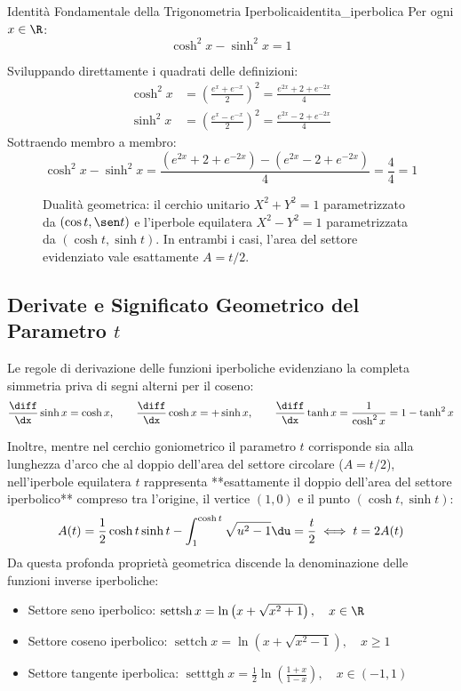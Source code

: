 \begin{teorema}{Identità Fondamentale della Trigonometria Iperbolica}{identita_iperbolica}
Per ogni $x \in \R$:
\[
    \cosh^2 x - \sinh^2 x = 1
\]
\end{teorema}

\begin{dimostrazione}
Sviluppando direttamente i quadrati delle definizioni:
\begin{align*}
    \cosh^2 x &= \left(\frac{e^x + e^{-x}}{2}\right)^2 = \frac{e^{2x} + 2 + e^{-2x}}{4} \\
    \sinh^2 x &= \left(\frac{e^x - e^{-x}}{2}\right)^2 = \frac{e^{2x} - 2 + e^{-2x}}{4}
\end{align*}
Sottraendo membro a membro:
\[
    \cosh^2 x - \sinh^2 x = \frac{(e^{2x} + 2 + e^{-2x}) - (e^{2x} - 2 + e^{-2x})}{4} = \frac{4}{4} = 1
\]
\end{dimostrazione}

\begin{figure}[htbp]
    \centering
    
    \caption{Dualità geometrica: il cerchio unitario $X^2+Y^2=1$ parametrizzato da $(\cos t, \sen t)$ e l'iperbole equilatera $X^2-Y^2=1$ parametrizzata da $(\cosh t, \sinh t)$. In entrambi i casi, l'area del settore evidenziato vale esattamente $A = t/2$.}
    \label{fig:dualita_iperbole_cerchio}
\end{figure}

\subsection{Derivate e Significato Geometrico del Parametro $t$}
Le regole di derivazione delle funzioni iperboliche evidenziano la completa simmetria priva di segni alterni per il coseno:
\[
    \frac{\diff}{\dx} \sinh x = \cosh x, \qquad \frac{\diff}{\dx} \cosh x = +\sinh x, \qquad \frac{\diff}{\dx} \tanh x = \frac{1}{\cosh^2 x} = 1 - \tanh^2 x
\]

Inoltre, mentre nel cerchio goniometrico il parametro $t$ corrisponde sia alla lunghezza d'arco che al doppio dell'area del settore circolare ($A = t/2$), nell'iperbole equilatera $t$ rappresenta **esattamente il doppio dell'area del settore iperbolico** compreso tra l'origine, il vertice $(1, 0)$ e il punto $(\cosh t, \sinh t)$:
\[
    A(t) = \frac{1}{2}\cosh t \sinh t - \int_1^{\cosh t} \sqrt{u^2 - 1}\du = \frac{t}{2} \iff t = 2 A(t)
\]
Da questa profonda proprietà geometrica discende la denominazione delle funzioni inverse iperboliche:
\begin{itemize}
    \item Settore seno iperbolico: $\operatorname{settsh} x = \ln\left(x + \sqrt{x^2 + 1}\right), \quad x \in \R$
    \item Settore coseno iperbolico: $\operatorname{settch} x = \ln\left(x + \sqrt{x^2 - 1}\right), \quad x \ge 1$
    \item Settore tangente iperbolica: $\operatorname{setttgh} x = \frac{1}{2}\ln\left(\frac{1+x}{1-x}\right), \quad x \in (-1, 1)$
\end{itemize}
